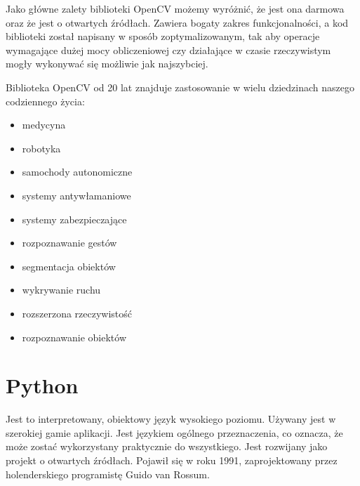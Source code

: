 \documentclass[a4paper,12pt,twoside,openany]{report}
\begin{document}
Jako główne zalety biblioteki OpenCV możemy wyróżnić, że jest ona darmowa oraz że jest o otwartych źródłach. Zawiera bogaty zakres funkcjonalności, a kod biblioteki został napisany w sposób zoptymalizowanym, tak aby operacje wymagające dużej mocy obliczeniowej czy działające w czasie rzeczywistym mogły wykonywać się możliwie jak najszybciej.

Biblioteka OpenCV od 20 lat znajduje zastosowanie w wielu dziedzinach naszego codziennego życia:
\begin{itemize} 
	\item medycyna
	\item robotyka
	\item samochody autonomiczne
	\item systemy antywłamaniowe 
	\item systemy zabezpieczające
	\item rozpoznawanie gestów
	\item segmentacja obiektów
	\item wykrywanie ruchu
	\item rozszerzona rzeczywistość
	\item rozpoznawanie obiektów
\end{itemize}

\section{Python}
Jest to interpretowany, obiektowy język wysokiego poziomu. Używany jest w szerokiej gamie  aplikacji. Jest językiem ogólnego przeznaczenia, co oznacza, że może zostać wykorzystany praktycznie do wszystkiego. Jest rozwijany jako projekt o otwartych źródłach. Pojawił się w roku 1991, zaprojektowany przez holenderskiego programistę Guido van Rossum\cite{python1}.  
\end{document}
